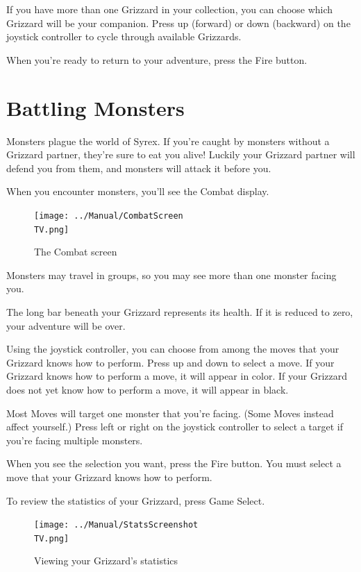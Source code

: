 \documentclass[10pt,twocolumn,openany,article]{memoir}
\newcommand\TV{NTSC}
\newcommand\TV{PAL}
\newcommand\TV{SECAM}
\begin{document}
\ifdefined\DEMO\else
If you  have more than one  Grizzard in your collection,  you can choose
which  Grizzard will  be  your  companion. Press  up  (forward) or  down
(backward)  on  the  joystick  controller  to  cycle  through  available
Grizzards.
\fi

When you're ready to return to your adventure, press the Fire button.


\section{Battling Monsters}

Monsters plague the world of Syrex. If you're caught by monsters without
a Grizzard partner, they're sure to eat you alive! Luckily your Grizzard
partner  will  defend  you  from  them,  and  monsters  will  attack  it
before you.

When you encounter monsters, you'll  see the Combat display.

\begin{figure}
  \texttt{[image: ../Manual/CombatScreen\\TV.png]}
  \caption{The Combat screen}
\end{figure}

Monsters may  travel in  groups, so  you may see  more than  one monster
facing you.

The  long bar  beneath your  Grizzard represents  its health.  If it  is
reduced to zero, your adventure will be over.

Using the joystick controller, you can  choose from among the moves that
your Grizzard knows how to perform. Press  up and down to select a move.
If your Grizzard knows  how to perform a move, it  will appear in color.
If your Grizzard does not yet know how to perform a move, it will appear
in black.

Most  Moves will  target one  monster  that you're  facing. (Some  Moves
instead affect yourself.) Press left or right on the joystick controller
to select a target if you're facing multiple monsters.

When you  see the selection  you want, press  the Fire button.  You must
select a move that your Grizzard knows how to perform.

To review the statistics of your Grizzard, press Game Select.

\begin{figure}
  \texttt{[image: ../Manual/StatsScreenshot\\TV.png]}
  \caption{Viewing your Grizzard's statistics}
\end{figure}
\end{document}
